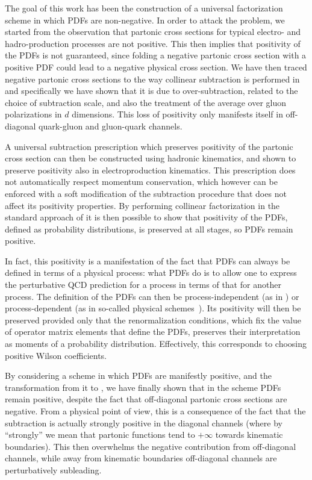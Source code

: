 
The goal of this work has been the construction of a universal factorization
scheme in which PDFs are non-negative.
In order to attack the problem, we started from the observation that \msbar{}
partonic cross sections for typical electro- and hadro-production processes are
not positive. This then implies that positivity of the PDFs is not guaranteed,
since folding a negative partonic cross section with a positive PDF could lead
to a negative physical cross section.
We have then traced negative partonic cross sections to the way collinear
subtraction is performed in \msbar{} and specifically we have shown that it is
due to over-subtraction, related to the choice of subtraction scale, and also
the treatment of the average over gluon polarizations in $d$ dimensions.
This loss of positivity only manifests itself  in off-diagonal quark-gluon and
gluon-quark channels.

A universal subtraction prescription  which preserves positivity of the partonic
cross section can then be constructed using hadronic kinematics, and
shown to preserve positivity also in electroproduction kinematics. This
prescription does not automatically respect momentum conservation,
which however can be enforced with a soft modification of the subtraction
procedure that does not affect its positivity properties. 
By performing collinear factorization in the standard approach of
\cite{Collins:1981uw,Curci:1980uw} it is then possible to show that positivity
of the PDFs, defined  as probability distributions, is preserved at all stages,
so PDFs remain positive.

In fact, this positivity is a manifestation of the fact that PDFs can
always be defined in terms of a physical process: what PDFs do is to
allow one to express the perturbative QCD prediction for a process in
terms of that for another process. The definition of the PDFs can then
be 
process-independent (as in \msbar{}) or process-dependent (as
in so-called physical schemes~\cite{Catani:1995ze,Diemoz:1987xu}).
Its positivity will then be preserved provided only that the renormalization
conditions, which fix the value of operator matrix elements that
define the PDFs, preserves their interpretation as moments of a
probability distribution. Effectively, this corresponds to choosing
positive Wilson coefficients.

By considering a scheme in which PDFs are manifestly positive, and the
transformation from it to \msbar{}, we have finally shown that in the
\msbar{} scheme PDFs remain positive, despite the fact that off-diagonal partonic
cross sections are negative. From a physical point of view, this is a consequence
of the fact that the \msbar{} subtraction is actually strongly positive
in the diagonal channels (where by ``strongly'' we mean that
partonic  functions tend to $+\infty$  towards kinematic
boundaries). This then overwhelms the negative contribution from
off-diagonal channels, while away from kinematic boundaries
off-diagonal channels are perturbatively subleading.

